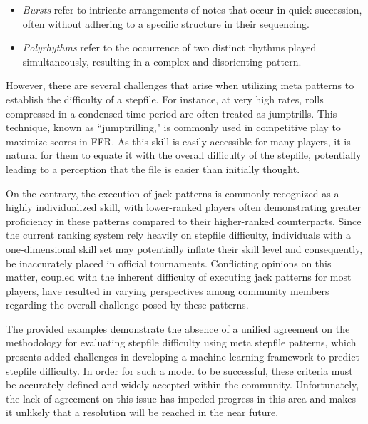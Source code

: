 \begin{itemize}
	\item \textit{Bursts} refer to intricate arrangements of notes that occur in quick succession, often without adhering to a specific structure in their sequencing.
	      
	\item \textit{Polyrhythms} refer to the occurrence of two distinct rhythms played simultaneously, resulting in a complex and disorienting pattern.
\end{itemize}

However, there are several challenges that arise when utilizing meta patterns to establish the difficulty of a stepfile. For instance, at very high rates, rolls compressed in a condensed time period are often treated as jumptrills. This technique, known as ``jumptrilling," is commonly used in competitive play to maximize scores in FFR. As this skill is easily accessible for many players, it is natural for them to equate it with the overall difficulty of the stepfile, potentially leading to a perception that the file is easier than initially thought.

\vspace{2mm}

On the contrary, the execution of jack patterns is commonly recognized as a highly individualized skill, with lower-ranked players often demonstrating greater proficiency in these patterns compared to their higher-ranked counterparts. Since the current ranking system rely heavily on stepfile difficulty, individuals with a one-dimensional skill set may potentially inflate their skill level and consequently, be inaccurately placed in official tournaments. Conflicting opinions on this matter, coupled with the inherent difficulty of executing jack patterns for most players, have resulted in varying perspectives among community members regarding the overall challenge posed by these patterns.

\vspace{2mm}

The provided examples demonstrate the absence of a unified agreement on the methodology for evaluating stepfile difficulty using meta stepfile patterns, which presents added challenges in developing a machine learning framework to predict stepfile difficulty. In order for such a model to be successful, these criteria must be accurately defined and widely accepted within the community. Unfortunately, the lack of agreement on this issue has impeded progress in this area and makes it unlikely that a resolution will be reached in the near future.

